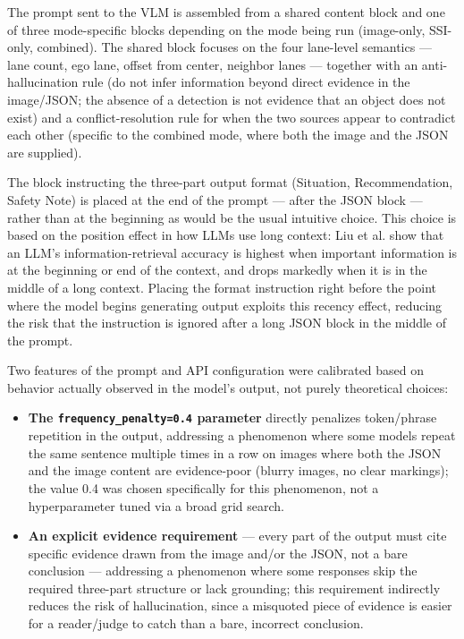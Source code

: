 \documentclass[12pt,a4paper]{report}
\begin{document}
The prompt sent to the VLM is assembled from a shared content block and one of three mode-specific blocks depending on the mode being run (image-only, SSI-only, combined). The shared block focuses on the four lane-level semantics --- lane count, ego lane, offset from center, neighbor lanes --- together with an anti-hallucination rule (do not infer information beyond direct evidence in the image/JSON; the absence of a detection is not evidence that an object does not exist) and a conflict-resolution rule for when the two sources appear to contradict each other (specific to the combined mode, where both the image and the JSON are supplied).

The block instructing the three-part output format (Situation, Recommendation, Safety Note) is placed at the end of the prompt --- after the JSON block --- rather than at the beginning as would be the usual intuitive choice. This choice is based on the position effect in how LLMs use long context: Liu et al. \cite{liu2024lostinmiddle} show that an LLM's information-retrieval accuracy is highest when important information is at the beginning or end of the context, and drops markedly when it is in the middle of a long context. Placing the format instruction right before the point where the model begins generating output exploits this recency effect, reducing the risk that the instruction is ignored after a long JSON block in the middle of the prompt.

Two features of the prompt and API configuration were calibrated based on behavior actually observed in the model's output, not purely theoretical choices:

\begin{itemize}
    \item \textbf{The \texttt{frequency\_penalty=0.4} parameter} directly penalizes token/phrase repetition in the output, addressing a phenomenon where some models repeat the same sentence multiple times in a row on images where both the JSON and the image content are evidence-poor (blurry images, no clear markings); the value 0.4 was chosen specifically for this phenomenon, not a hyperparameter tuned via a broad grid search.
    \item \textbf{An explicit evidence requirement} --- every part of the output must cite specific evidence drawn from the image and/or the JSON, not a bare conclusion --- addressing a phenomenon where some responses skip the required three-part structure or lack grounding; this requirement indirectly reduces the risk of hallucination, since a misquoted piece of evidence is easier for a reader/judge to catch than a bare, incorrect conclusion.
\end{itemize}
\end{document}
